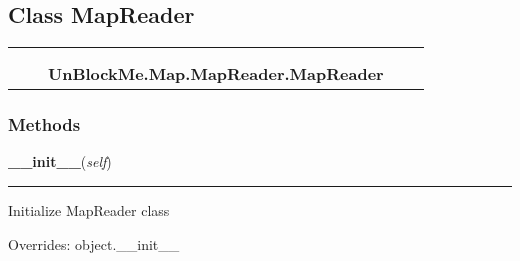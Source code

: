 \subsection{Class MapReader}

    \label{UnBlockMe:Map:MapReader:MapReader}
\begin{tabular}{cccccc}
\multicolumn{2}{r}{\settowidth{\BCL}{object}\multirow{2}{\BCL}{object}}
&&
  \\\cline{3-3}
  &&\multicolumn{1}{c|}{}
&&
  \\
&&\multicolumn{2}{l}{\textbf{UnBlockMe.Map.MapReader.MapReader}}
\end{tabular}



  \subsubsection{Methods}

    \vspace{0.5ex}

\hspace{.8\funcindent}\begin{boxedminipage}{\funcwidth}

    \raggedright \textbf{\_\_init\_\_}(\textit{self})

    \vspace{-1.5ex}

    \rule{\textwidth}{0.5\fboxrule}
\setlength{\parskip}{2ex}
    Initialize MapReader class

\setlength{\parskip}{1ex}
      Overrides: object.\_\_init\_\_

    \end{boxedminipage}

    \label{UnBlockMe:Map:MapReader:MapReader:load}

    \vspace{0.5ex}

